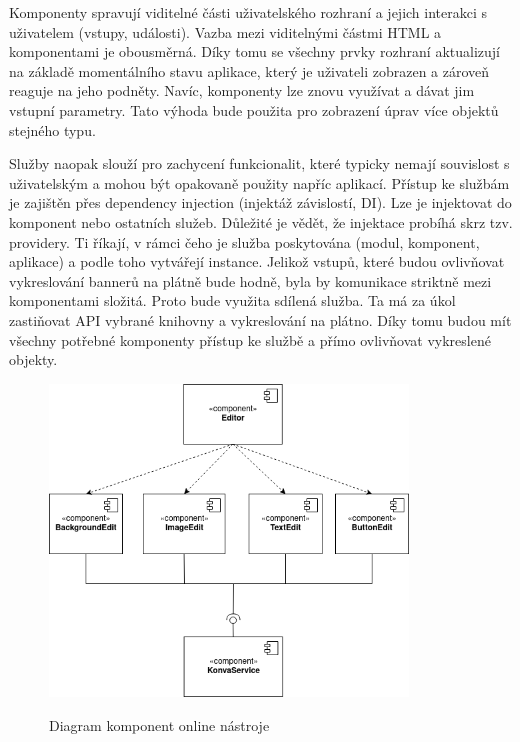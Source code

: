     Komponenty spravují viditelné části uživatelského rozhraní a jejich interakci s uživatelem (vstupy, události).
    Vazba mezi viditelnými částmi HTML a komponentami je obousměrná. Díky tomu se všechny prvky rozhraní aktualizují na základě momentálního stavu aplikace,
    který je uživateli zobrazen a zároveň reaguje na jeho podněty. Navíc, komponenty lze znovu využívat a dávat jim vstupní parametry.
    Tato výhoda bude použita pro zobrazení úprav více objektů stejného typu. 

    Služby naopak slouží pro zachycení funkcionalit, které typicky nemají souvislost s uživatelským a mohou být opakovaně použity napříc aplikací.
    Přístup ke službám je zajištěn přes dependency injection (injektáž závislostí, DI). Lze je injektovat do komponent nebo ostatních služeb.
    Důležité je vědět, že injektace probíhá skrz tzv. providery. Ti říkají, v rámci čeho je služba poskytována (modul, komponent, aplikace) a
    podle toho vytvářejí instance. Jelikož vstupů, které budou ovlivňovat vykreslování bannerů na plátně bude hodně,
    byla by komunikace striktně mezi komponentami složitá. Proto bude využita sdílená služba.
    Ta má za úkol zastiňovat API vybrané knihovny a vykreslování na plátno. Díky tomu budou mít všechny potřebné komponenty přístup ke službě a
    přímo ovlivňovat vykreslené objekty.

    \begin{figure}[h]
        \centering
        \includegraphics[width=0.85\textwidth]{Figures/component-diagram.png}
        \label{fig:component-diagram}
        \caption[Diagram komponent editoru]{Diagram komponent online nástroje}
    \end{figure}

